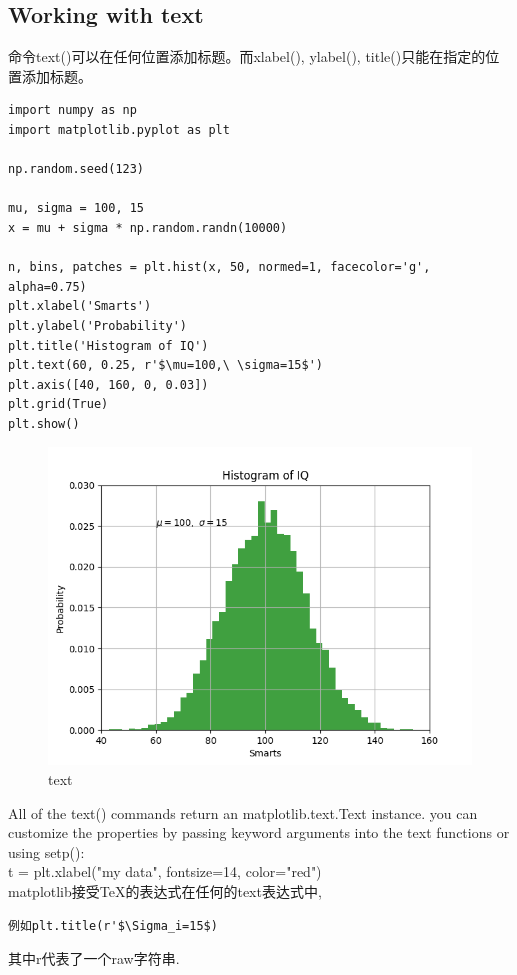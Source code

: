 \subsection{Working with text}
命令text()可以在任何位置添加标题。而xlabel(), ylabel(), title()只能在指定的位置添加标题。

\begin{lstlisting}
import numpy as np
import matplotlib.pyplot as plt

np.random.seed(123)  

mu, sigma = 100, 15
x = mu + sigma * np.random.randn(10000)

n, bins, patches = plt.hist(x, 50, normed=1, facecolor='g', alpha=0.75)
plt.xlabel('Smarts')
plt.ylabel('Probability')
plt.title('Histogram of IQ')
plt.text(60, 0.25, r'$\mu=100,\ \sigma=15$')
plt.axis([40, 160, 0, 0.03])
plt.grid(True)
plt.show()
\end{lstlisting}
\begin{figure}
  \centering
  \includegraphics{./figure/text.png}
  \caption{text}
  \label{fig:text}
\end{figure}

All of the text() commands return an matplotlib.text.Text instance. you can customize the properties by passing keyword 
arguments into the text functions or using setp():\\
t = plt.xlabel("my data", fontsize=14, color="red")\\

matplotlib接受TeX的表达式在任何的text表达式中,
\begin{verbatim}
例如plt.title(r'$\Sigma_i=15$)
\end{verbatim}
其中r代表了一个raw字符串.
